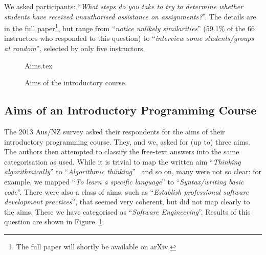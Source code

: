 \documentclass{sig-alternate}
\begin{document}
We asked participants: ``{\emph{What steps do you take to try to
determine whether students have received unauthorised assistance on
assignments?}}''. The details are in the full paper\footnote{The full
paper will shortly be available on arXiv.}, but range from
``{\emph{notice unlikely similarities}}'' (59.1\% of the 66
instructors who responded to this question) to ``{\emph{interview some
students/groups at random}}'', selected by only five instructors.


\iffalse
We report our results in Figure~\ref{fig:Plagiarise}, as we think they
are of general interest.

\fi

\begin{figure}
\begin{center}
{Aims.tex}
\end{center}\vskip-18pt
\caption{Aims of the introductory course. \label{fig:aims}}
\end{figure}

\subsection{Aims of an Introductory Programming Course}

The 2013 Aus/NZ survey asked their respondents for the aims of their
introductory programming course. They, and we, asked for (up to) three
aims. The authors then attempted to classify the free-text answers
into the same categorisation as \cite{mason+cooper:2014} used. While
it is trivial to map the written aim ``{\emph{Thinking
algorithmically}}'' to ``{\emph{Algorithmic
thinking}}''~\cite{mason+cooper:2014} and so on, many were not so
clear: for example, we mapped ``{\emph{To learn a specific
language}}'' to ``{\emph{Syntax/writing basic code}}''. There were
also a class of aims, such as ``{\emph{Establish professional software
development practices}}'', that seemed very coherent, but did not map
clearly to the \cite{mason+cooper:2014} aims. These we have
categorised as ``{\emph{Software Engineering}}''. Results of this
question are shown in Figure~\ref{fig:aims}.
\end{document}
